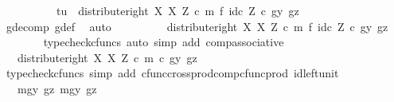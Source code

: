 \begin{isabellebody}
\ \ \isamarkupfalse%
\ {\isacharminus}{\kern0pt}\isanewline
\ \ \ \ \isamarkupfalse%
\ {\isachardoublequoteopen}{\isasymlangle}t{\isacharcomma}{\kern0pt}u{\isasymrangle}\ {\isacharequal}{\kern0pt}\ {\isacharparenleft}{\kern0pt}distribute{\isacharunderscore}{\kern0pt}right\ X\ X\ Z\ {\isasymcirc}\isactrlsub c\ m\ {\isasymtimes}\isactrlsub f\ id\isactrlsub c\ Z{\isacharparenright}{\kern0pt}\ {\isasymcirc}\isactrlsub c\ {\isasymlangle}gy{\isacharcomma}{\kern0pt}\ gz{\isasymrangle}{\isachardoublequoteclose}\isanewline
\ \ \ \ \ \ \isamarkupfalse%
\ g{\isacharunderscore}{\kern0pt}decomp\ g{\isacharunderscore}{\kern0pt}def\ \isamarkupfalse%
\ auto\isanewline
\ \ \ \ \isamarkupfalse%
\ \isamarkupfalse%
\ {\isachardoublequoteopen}{\isachardot}{\kern0pt}{\isachardot}{\kern0pt}{\isachardot}{\kern0pt}\ {\isacharequal}{\kern0pt}\ distribute{\isacharunderscore}{\kern0pt}right\ X\ X\ Z\ {\isasymcirc}\isactrlsub c\ {\isacharparenleft}{\kern0pt}m\ {\isasymtimes}\isactrlsub f\ id\isactrlsub c\ Z{\isacharparenright}{\kern0pt}\ {\isasymcirc}\isactrlsub c\ {\isasymlangle}gy{\isacharcomma}{\kern0pt}\ gz{\isasymrangle}{\isachardoublequoteclose}\isanewline
\ \ \ \ \ \ \isamarkupfalse%
\ {\isacharparenleft}{\kern0pt}typecheck{\isacharunderscore}{\kern0pt}cfuncs{\isacharcomma}{\kern0pt}\ auto\ simp\ add{\isacharcolon}{\kern0pt}\ comp{\isacharunderscore}{\kern0pt}associative{}{\isacharparenright}{\kern0pt}\isanewline
\ \ \ \ \isamarkupfalse%
\ \isamarkupfalse%
\ {\isachardoublequoteopen}{\isachardot}{\kern0pt}{\isachardot}{\kern0pt}{\isachardot}{\kern0pt}\ {\isacharequal}{\kern0pt}\ distribute{\isacharunderscore}{\kern0pt}right\ X\ X\ Z\ {\isasymcirc}\isactrlsub c\ {\isasymlangle}m\ {\isasymcirc}\isactrlsub c\ gy{\isacharcomma}{\kern0pt}\ gz{\isasymrangle}{\isachardoublequoteclose}\isanewline
\ \ \ \ \ \ \isamarkupfalse%
\ {\isacharparenleft}{\kern0pt}typecheck{\isacharunderscore}{\kern0pt}cfuncs{\isacharcomma}{\kern0pt}\ simp\ add{\isacharcolon}{\kern0pt}\ cfunc{\isacharunderscore}{\kern0pt}cross{\isacharunderscore}{\kern0pt}prod{\isacharunderscore}{\kern0pt}comp{\isacharunderscore}{\kern0pt}cfunc{\isacharunderscore}{\kern0pt}prod\ id{\isacharunderscore}{\kern0pt}left{\isacharunderscore}{\kern0pt}unit{}{\isacharparenright}{\kern0pt}\isanewline
\ \ \ \ \isamarkupfalse%
\ \isamarkupfalse%
\ {\isachardoublequoteopen}{\isachardot}{\kern0pt}{\isachardot}{\kern0pt}{\isachardot}{\kern0pt}\ {\isacharequal}{\kern0pt}\ {\isasymlangle}{\isasymlangle}mgy{}{\isacharcomma}{\kern0pt}\ gz{\isasymrangle}{\isacharcomma}{\kern0pt}\ {\isasymlangle}mgy{}{\isacharcomma}{\kern0pt}\ gz{\isasymrangle}{\isasymrangle}{\isachardoublequoteclose}\isanewline

\end{isabellebody}
